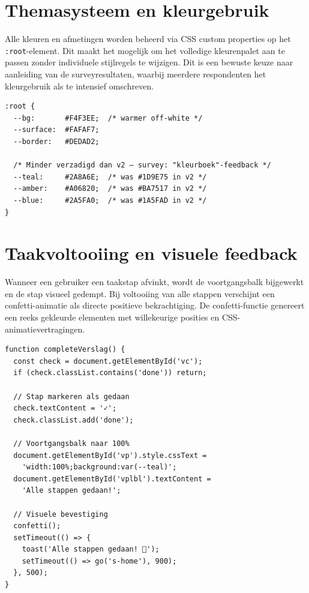 \section{Themasysteem en kleurgebruik}

Alle kleuren en afmetingen worden beheerd via CSS custom properties op het
\texttt{:root}-element. Dit maakt het mogelijk om het volledige kleurenpalet
aan te passen zonder individuele stijlregels te wijzigen. Dit is een bewuste keuze
naar aanleiding van de surveyresultaten, waarbij meerdere respondenten het
kleurgebruik als te intensief omschreven.

\begin{listing}[ht]
\caption[CSS custom properties]{Fragment van het themasysteem in Flow~v3. Alle
kleuren zijn minder verzadigd dan in v2 op basis van de surveyresultaten.}
\label{lst:thema}
\begin{verbatim}
:root {
  --bg:       #F4F3EE;  /* warmer off-white */
  --surface:  #FAFAF7;
  --border:   #DEDAD2;

  /* Minder verzadigd dan v2 — survey: "kleurboek"-feedback */
  --teal:     #2A8A6E;  /* was #1D9E75 in v2 */
  --amber:    #A06820;  /* was #BA7517 in v2 */
  --blue:     #2A5FA0;  /* was #1A5FAD in v2 */
}
\end{verbatim}
\end{listing}

\section{Taakvoltooiing en visuele feedback}

Wanneer een gebruiker een taakstap afvinkt, wordt de voortgangsbalk bijgewerkt
en de stap visueel gedempt. Bij voltooiing van alle stappen verschijnt een
confetti-animatie als directe positieve bekrachtiging. De confetti-functie
genereert een reeks gekleurde elementen met willekeurige posities en
CSS-animatievertragingen.

\begin{listing}[ht]
\caption[Taakvoltooiing]{Functie die een taakstap afvinkt, de voortgangsbalk
bijwerkt en bij volledige voltooiing confetti activeert.}
\label{lst:voltooiing}
\begin{verbatim}
function completeVerslag() {
  const check = document.getElementById('vc');
  if (check.classList.contains('done')) return;

  // Stap markeren als gedaan
  check.textContent = '✓';
  check.classList.add('done');

  // Voortgangsbalk naar 100%
  document.getElementById('vp').style.cssText =
    'width:100%;background:var(--teal)';
  document.getElementById('vplbl').textContent =
    'Alle stappen gedaan!';

  // Visuele bevestiging
  confetti();
  setTimeout(() => {
    toast('Alle stappen gedaan! 🎉');
    setTimeout(() => go('s-home'), 900);
  }, 500);
}
\end{verbatim}
\end{listing}

